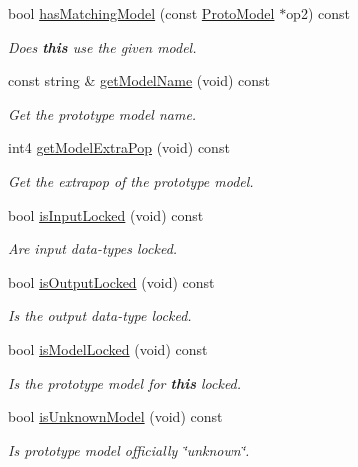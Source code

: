 \begin{DoxyCompactItemize}
bool \mbox{\hyperlink{class_func_proto_a6a86f7c68b557f329ab6193ffadfb768}{has\+Matching\+Model}} (const \mbox{\hyperlink{class_proto_model}{Proto\+Model}} $\ast$op2) const
\begin{DoxyCompactList}\small\item\em Does {\bfseries{this}} use the given model. \end{DoxyCompactList}\item 
const string \& \mbox{\hyperlink{class_func_proto_abd50bddd2379651954a05e2015ab907e}{get\+Model\+Name}} (void) const
\begin{DoxyCompactList}\small\item\em Get the prototype model name. \end{DoxyCompactList}\item 
int4 \mbox{\hyperlink{class_func_proto_a36076943e0845125efffbd7d1d1e46ef}{get\+Model\+Extra\+Pop}} (void) const
\begin{DoxyCompactList}\small\item\em Get the {\itshape extrapop} of the prototype model. \end{DoxyCompactList}\item 
bool \mbox{\hyperlink{class_func_proto_aab52f093617d8bd8a67f011ba5a0d324}{is\+Input\+Locked}} (void) const
\begin{DoxyCompactList}\small\item\em Are input data-\/types locked. \end{DoxyCompactList}\item 
bool \mbox{\hyperlink{class_func_proto_aa8e57d21d21d08253f67cb201e83c5e4}{is\+Output\+Locked}} (void) const
\begin{DoxyCompactList}\small\item\em Is the output data-\/type locked. \end{DoxyCompactList}\item 
bool \mbox{\hyperlink{class_func_proto_a34162359ab3bd910a376bdad196f52e0}{is\+Model\+Locked}} (void) const
\begin{DoxyCompactList}\small\item\em Is the prototype model for {\bfseries{this}} locked. \end{DoxyCompactList}\item 
bool \mbox{\hyperlink{class_func_proto_ac002aea4a1495011c1a577d343755c21}{is\+Unknown\+Model}} (void) const
\begin{DoxyCompactList}\small\item\em Is prototype model officially \char`\"{}unknown\char`\"{}. \end{DoxyCompactList}\item 

\end{DoxyCompactItemize}
